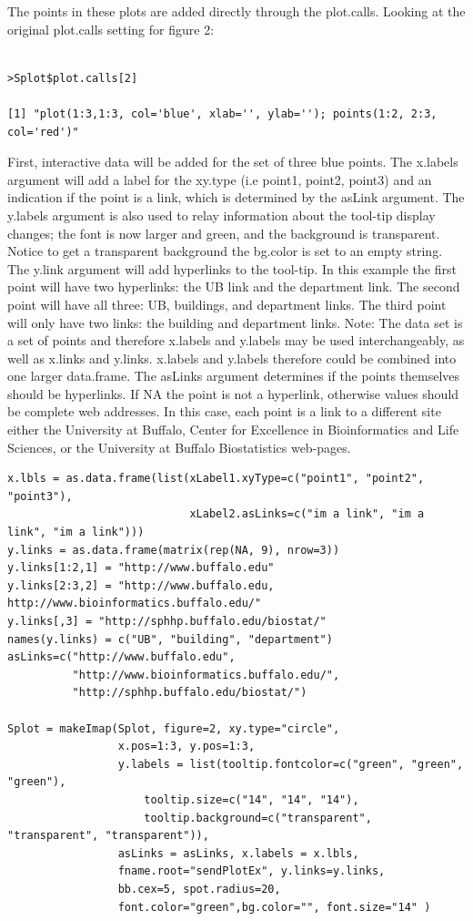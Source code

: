 \documentclass[]{article}
\begin{document}
The points in these plots are added directly through the plot.calls. Looking at the original plot.calls setting for figure 2:

\begin{verbatim}

>Splot$plot.calls[2]

[1] "plot(1:3,1:3, col='blue', xlab='', ylab=''); points(1:2, 2:3, col='red')"

\end{verbatim}


First, interactive data will be added for the set of three blue points. The x.labels argument will add a label for the xy.type (i.e point1, point2, point3) and an indication if the point is a link, which is determined by the asLink argument. The y.labels argument is also used to relay information about the tool-tip display changes; the font is now larger and green, and the background is transparent. Notice to get a transparent background the bg.color is set to an empty string.  The y.link argument will add hyperlinks to the tool-tip. In this example the first point will have two hyperlinks: the UB link and the department link. The second point will have all three: UB, buildings, and department links. The third point will only have two links: the building and department links. Note: The data set is a set of points and therefore x.labels and y.labels may be used interchangeably, as well as x.links and y.links. x.labels and y.labels therefore could be combined into one larger data.frame. The asLinks argument determines if the points themselves should be hyperlinks. If NA the point is not a hyperlink, otherwise values should be complete web addresses. In this case, each point is a link to a different site either the University at Buffalo, Center for Excellence in Bioinformatics and Life Sciences, or the University at Buffalo Biostatistics web-pages.


\begin{verbatim}
x.lbls = as.data.frame(list(xLabel1.xyType=c("point1", "point2", "point3"),
                            xLabel2.asLinks=c("im a link", "im a link", "im a link")))
y.links = as.data.frame(matrix(rep(NA, 9), nrow=3))
y.links[1:2,1] = "http://www.buffalo.edu"
y.links[2:3,2] = "http://www.buffalo.edu, http://www.bioinformatics.buffalo.edu/"
y.links[,3] = "http://sphhp.buffalo.edu/biostat/"
names(y.links) = c("UB", "building", "department")
asLinks=c("http://www.buffalo.edu",
          "http://www.bioinformatics.buffalo.edu/",
          "http://sphhp.buffalo.edu/biostat/")

Splot = makeImap(Splot, figure=2, xy.type="circle",
                 x.pos=1:3, y.pos=1:3,
                 y.labels = list(tooltip.fontcolor=c("green", "green", "green"),
                     tooltip.size=c("14", "14", "14"),
                     tooltip.background=c("transparent", "transparent", "transparent")), 
                 asLinks = asLinks, x.labels = x.lbls,
                 fname.root="sendPlotEx", y.links=y.links,
                 bb.cex=5, spot.radius=20,
                 font.color="green",bg.color="", font.size="14" )

\end{verbatim}
\end{document}
